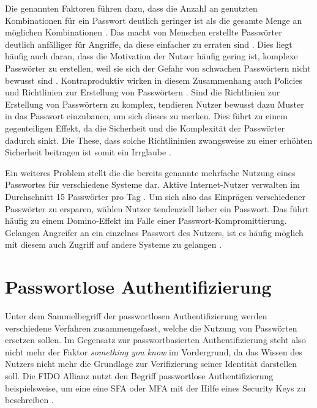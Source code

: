 Die genannten Faktoren führen dazu, dass die Anzahl an genutzten Kombinationen für ein Passwort deutlich geringer ist als die gesamte Menge an möglichen Kombinationen \cite{boonkrong2012security}. Das macht von Menschen erstellte Passwörter deutlich anfälliger für Angriffe, da diese einfacher zu erraten sind \cite{chanda2016password}. Dies liegt häufig auch daran, dass die Motivation der Nutzer häufig gering ist, komplexe Passwörter zu erstellen, weil sie sich der Gefahr von schwachen Passwörtern nicht bewusst sind \cite{yildirim2019encouraging}. Kontraproduktiv wirken in diesem Zusammenhang auch Policies und Richtlinien zur Erstellung von Passwörtern \cite{yildirim2019encouraging}. Sind die Richtlinien zur Erstellung von Passwörtern zu komplex, tendieren Nutzer bewusst dazu Muster in das Passwort einzubauen, um sich dieses zu merken. Dies führt zu einem gegenteiligen Effekt, da die Sicherheit und die Komplexität der Passwörter dadurch sinkt. Die These, dass solche Richtlininien zwangsweise zu einer erhöhten Sicherheit beitragen ist somit ein Irrglaube \cite{yildirim2019encouraging} \cite{morii2017research}.

Ein weiteres Problem stellt die die bereits genannte mehrfache Nutzung eines Passwortes für verschiedene Systeme dar. Aktive Internet-Nutzer verwalten im Durchschnitt 15 Passwörter pro Tag \cite{ives2004domino}. Um sich also das Einprägen verschiedener Passwörter zu ersparen, wählen Nutzer tendenziell lieber ein Passwort. Das führt häufig zu einem Domino-Effekt im Falle einer Passwort-Kompromittierung. Gelangen Angreifer an ein einzelnes Passwort des Nutzers, ist es häufig möglich mit diesem auch Zugriff auf andere Systeme zu gelangen \cite{ives2004domino} \cite{morii2017research}. 


\section{Passwortlose Authentifizierung}

Unter dem Sammelbegriff der passwortlosen Authentifizierung werden verschiedene Verfahren zusammengefasst, welche die Nutzung von Passwörten ersetzen sollen. Im Gegensatz zur passwortbasierten Authentifizierung steht also nicht mehr der Faktor \textit{something you know} im Vordergrund, da das Wissen des Nutzers nicht mehr die Grundlage zur Verifizierung seiner Identität darstellen soll. Die \ac{FIDO} Allianz nutzt den Begriff passwortlose Authentifizierung beispielsweise, um eine eine \ac{SFA} oder \ac{MFA} mit der Hilfe eines Security Keys zu beschreiben \cite{farke2020you}. 

